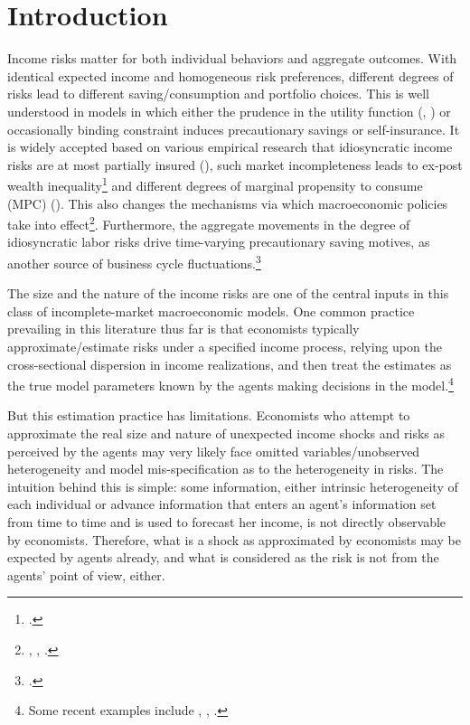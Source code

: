 
    \hypertarget{introduction}{%
\section{Introduction}\label{introduction}}

Income risks matter for both individual behaviors and aggregate
outcomes. With identical expected income and homogeneous risk
preferences, different degrees of risks lead to different
saving/consumption and portfolio choices. This is well understood in
models in which either the prudence in the utility function
(\cite{kimball1990precautionary}, \cite{carroll2001liquidity}) or occasionally binding constraint induces precautionary
savings or self-insurance. It is widely accepted based on various empirical research that
idiosyncratic income risks are at most partially insured
(\cite{blundell_consumption_2008}), such market incompleteness leads
to ex-post wealth inequality\footnote{\cite{ aiyagari1994uninsured,huggett1996wealth,carroll1997nature,krusell1998income}.} and different degrees of marginal
propensity to consume (MPC) (\cite{krueger2016macroeconomics, carroll2017distribution}). This also changes the mechanisms via which macroeconomic policies take into effect\footnote{\cite{krueger2016macroeconomics}, \cite{kaplan2018monetary}, \cite{auclert2019monetary}.}. Furthermore, the aggregate movements in the degree of idiosyncratic labor risks drive time-varying precautionary saving motives, as another source of business cycle fluctuations.\footnote{ \cite{challe2016precautionary, mckay2017time,heathcote2018wealth, kaplan2018microeconomic,den2018unemployment,bayer2019precautionary, acharya2020understanding,ravn2021macroeconomic}.}

The size and the nature of the income risks are one of the central inputs in this class of incomplete-market macroeconomic models. One common practice prevailing in this literature thus far is that economists typically approximate/estimate risks under a specified income process, relying upon the cross-sectional dispersion in income realizations, and then treat the estimates
as the true model parameters known by the agents making decisions in the
model.\footnote{Some recent examples include \cite{krueger2016macroeconomics}, \cite{bayer2019precautionary}, \cite{kaplan2018monetary}.}
  
  
But this estimation practice has limitations. Economists who attempt to approximate the real size and nature of unexpected income shocks and risks as perceived by the agents may very likely face omitted variables/unobserved heterogeneity and model mis-specification as to the heterogeneity in risks. The intuition behind this is simple: some information, either intrinsic heterogeneity of each individual or advance information that enters an agent's information set from time to time and is used to forecast her income, is not directly observable by economists. Therefore, what is a shock as approximated by economists may be expected by agents already, and what is considered as the risk is not from the agents' point of view, either.



